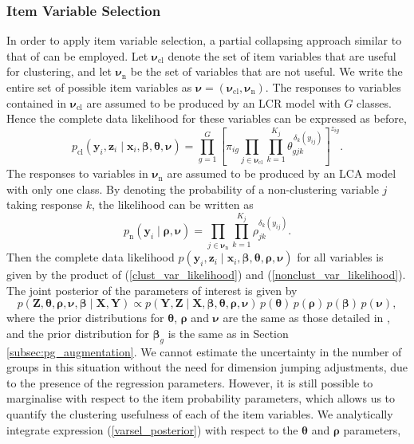 \documentclass[11pt]{article}
\def\cl{\operatorname{cl}}
\def\nsub{\operatorname{n}}
\def\boldx{\mathbf{x}}
\def\boldy{\mathbf{y}}
\def\boldz{\mathbf{z}}
\def\boldX{\mathbf{X}}
\def\boldY{\mathbf{Y}}
\def\boldZ{\mathbf{Z}}
\def\bsbet{\boldsymbol{\beta}}
\def\bsthet{\boldsymbol{\theta}}
\def\bsnu{\boldsymbol{\nu}}
\def\bsrho{\boldsymbol{\rho}}
\theoremstyle{plain}
\theoremstyle{definition}
\begin{document}
\subsubsection{Item Variable Selection}\label{subsubsec:item_var_sel}
In order to apply item variable selection, a partial collapsing approach similar to that of \citet{white_bayesian_2016} can be employed. Let $\bsnu_{\cl}$ denote the set of item variables that are useful for clustering, and let $\bsnu_{\nsub}$ be the set of variables that are not useful. We write the entire set of possible item variables as $\bsnu = (\bsnu_{\cl}, \bsnu_{\nsub})$. The responses to variables contained in $\bsnu_{\cl}$ are assumed to be produced by an LCR model with $G$ classes. Hence the complete data likelihood for these variables can be expressed as before,
\begin{equation}\label{clust_var_likelihood}
    p_{\cl}(\boldy_i, \boldz_{i} \mid \boldx_i, \bsbet, \bsthet, \bsnu) = \prod_{g=1}^G \left[ 
    \pi_{ig} \prod_{j \in \bsnu_{\cl}} \prod_{k=1}^{K_j} \theta_{gjk}^{\,\delta_k(y_{ij})} \right]^{z_{ig}}. 
\end{equation}
The responses to variables in $\bsnu_{\nsub}$ are assumed to be produced by an LCA model with only one class. By denoting the probability of a non-clustering variable $j$ taking response $k$, the likelihood can be written as
\begin{equation}\label{nonclust_var_likelihood}
p_{\nsub}(\boldy_i \mid \bsrho, \bsnu) = \prod_{j \in \bsnu_{\nsub}} \prod_{k=1}^{K_j} \rho_{jk}^{\delta_k(y_{ij})}. %
\end{equation}
Then the complete data likelihood $p(\boldy_i, \boldz_i \mid \boldx_i, \bsbet, \bsthet, \bsrho, \bsnu)$ for all variables is given by the product of (\ref{clust_var_likelihood}) and (\ref{nonclust_var_likelihood}). 
The joint posterior of the parameters of interest is given by
\begin{equation}\label{varsel_posterior}
    p(\boldZ, \bsthet, \bsrho, \bsnu, \bsbet \mid \boldX, \boldY) \propto p(\boldY, \boldZ \mid \boldX, \bsbet, \bsthet, \bsrho, \bsnu)\,p(\bsthet)\,p(\bsrho)\,p(\bsbet)\,p(\bsnu),
\end{equation}
where the prior distributions for $\bsthet$, $\bsrho$ and $\bsnu$ are the same as those detailed in \cite{white_bayesian_2016}, and the prior distribution for $\bsbet_g$ is the same as in Section \ref{subsec:pg_augmentation}.
We cannot estimate the uncertainty in the number of groups in this situation without the need for dimension jumping adjustments, due to the presence of the regression parameters. However, it is still possible to marginalise with respect to the item probability parameters, which allows us to quantify the clustering usefulness of each of the item variables. We analytically integrate expression (\ref{varsel_posterior}) with respect to the $\bsthet$ and $\bsrho$ parameters,
\end{document}
